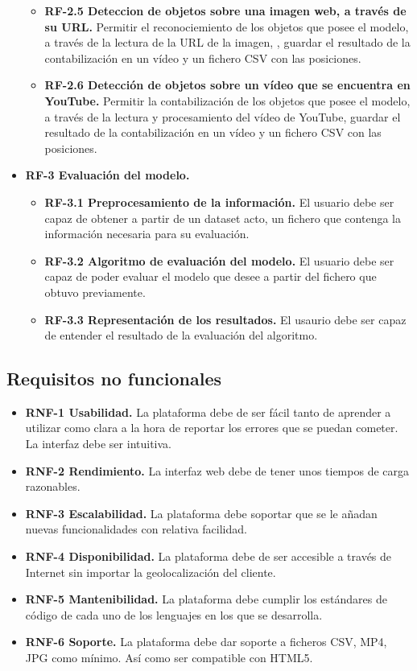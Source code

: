 \begin{itemize}
\begin{itemize}
      \item \textbf{RF-2.5 Deteccion de objetos sobre una imagen web, a través de su URL.} Permitir el reconociemiento de los objetos que posee el modelo, a través de la lectura de la URL de la imagen, , guardar el resultado de la contabilización en un vídeo y un fichero CSV con las posiciones.
      \item \textbf{RF-2.6 Detección de objetos sobre un vídeo que se encuentra en YouTube.} Permitir la contabilización de los objetos que posee el modelo, a través de la lectura y procesamiento del vídeo de YouTube, guardar el resultado de la contabilización en un vídeo y un fichero CSV con las posiciones.  
    \end{itemize}
    \item \textbf{RF-3 Evaluación del modelo.}
    \begin{itemize}
      \item \textbf{RF-3.1 Preprocesamiento de la información.} El usuario debe ser capaz de obtener a partir de un dataset acto, un fichero que contenga la información necesaria para su evaluación.
      \item \textbf{RF-3.2 Algoritmo de evaluación del modelo.} El usuario debe ser capaz de poder evaluar el modelo que desee a partir del fichero que obtuvo previamente.
      \item \textbf{RF-3.3 Representación de los resultados.} El usaurio debe ser capaz de entender el resultado de la evaluación del algoritmo.
    \end{itemize}
\end{itemize}

\subsection{Requisitos no funcionales}
\begin{itemize}
\item \textbf{RNF-1 Usabilidad.} La plataforma debe de ser fácil tanto de aprender a utilizar como clara a la hora de reportar los errores que se puedan cometer. La interfaz debe ser intuitiva.
\item \textbf{RNF-2 Rendimiento.} La interfaz web debe de tener unos tiempos de carga razonables.
\item \textbf{RNF-3 Escalabilidad.} La plataforma debe soportar que se le añadan nuevas funcionalidades con relativa facilidad.
\item \textbf{RNF-4 Disponibilidad.} La plataforma debe de ser accesible a través de Internet sin importar la geolocalización del cliente.
\item \textbf{RNF-5 Mantenibilidad.} La plataforma debe cumplir los estándares de código de cada uno de los lenguajes en los que se desarrolla. 
\item \textbf{RNF-6 Soporte.} La plataforma debe dar soporte a ficheros CSV, MP4, JPG como mínimo. Así como ser compatible con HTML5.
\end{itemize}


